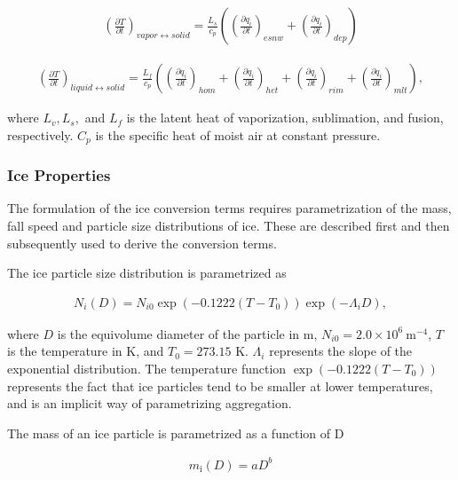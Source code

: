 \begin{eqnarray}
\left(\frac{\partial T}{\partial t}\right)_{vapor \leftrightarrow solid}
=\frac{L_{s}}{c_{p}}\left(
\left(\frac{\partial q_i}{\partial t}\right)_{esnw}
+\left(\frac{\partial q_i}{\partial t}\right)_{dep}
\right)
\end{eqnarray}

\begin{eqnarray}
\left(\frac{\partial T}{\partial t}\right)_{liquid \leftrightarrow solid}
=\frac{L_{f}}{c_{p}}\left(
\left(\frac{\partial q_i}{\partial t}\right)_{hom}
+\left(\frac{\partial q_i}{\partial t}\right)_{het}
+\left(\frac{\partial q_i}{\partial t}\right)_{rim}
+\left(\frac{\partial q_i}{\partial t}\right)_{mlt}
\right),
\end{eqnarray}

where \(L_v, L_s,\) and \(L_f\) is the latent heat of vaporization,
sublimation, and fusion, respectively. \(C_p\) is the specific heat of
moist air at constant pressure.

\hypertarget{ice-properties}{%
\subsubsection{Ice Properties}\label{ice-properties}}

The formulation of the ice conversion terms requires parametrization of
the mass, fall speed and particle size distributions of ice. These are
described first and then subsequently used to derive the conversion
terms.

The ice particle size distribution is parametrized as

\begin{eqnarray}
N_{i}(D)=N_{i0} \exp (-0.1222 (T-T_{0})) \exp \left(-\Lambda_{i} D\right),
\label{WB99.A1}
\end{eqnarray}

where \(D\) is the equivolume diameter of the particle in
\(\mathrm{m}\), \(N_{i0}=2.0 \times 10^{6} \mathrm{~m}^{-4}\), \(T\) is
the temperature in \(\mathrm{K}\), and \(T_{0}= 273.15\) \(\mathrm{K}\).
\(\Lambda_{i}\) represents the slope of the exponential distribution.
The temperature function \(\exp (-0.1222 (T-T_0))\) represents the fact
that ice particles tend to be smaller at lower temperatures, and is an
implicit way of parametrizing aggregation.

The mass of an ice particle is parametrized as a function of D

\begin{eqnarray}
m_{\mathrm{i}}(D)=a D^{b}
\label{WB99.A2}
\end{eqnarray}


